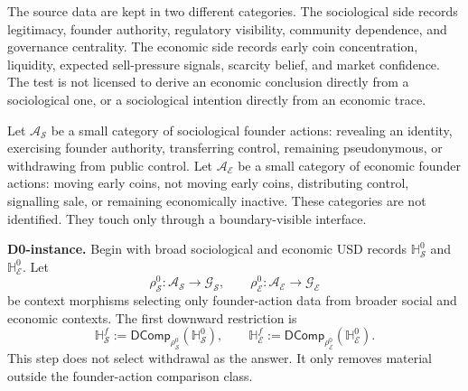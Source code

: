 \documentclass[11pt]{article}
\newcommand{\defeq}{\mathrel{:=}}
\newcommand{\DComp}{\mathsf{DComp}}
\theoremstyle{definition}
\theoremstyle{plain}
\begin{document}
The source data are kept in two different categories.  The sociological
side records legitimacy, founder authority, regulatory visibility,
community dependence, and governance centrality.  The economic side
records early coin concentration, liquidity, expected sell-pressure
signals, scarcity belief, and market confidence.  The test is not
licensed to derive an economic conclusion directly from a sociological
one, or a sociological intention directly from an economic trace.

Let $\mathcal A_{\mathcal S}$ be a small category of sociological founder
actions: revealing an identity, exercising founder authority, transferring
control, remaining pseudonymous, or withdrawing from public control.  Let
$\mathcal A_{\mathcal E}$ be a small category of economic founder actions:
moving early coins, not moving early coins, distributing control,
signalling sale, or remaining economically inactive.  These categories are
not identified.  They touch only through a boundary-visible interface.

\textbf{D0-instance.}  Begin with broad sociological and economic USD records
$\mathbb H_{\mathcal S}^{0}$ and $\mathbb H_{\mathcal E}^{0}$.  Let
\[
  \rho_{\mathcal S}^{0}:
  \mathcal A_{\mathcal S}\to\mathcal G_{\mathcal S},
  \qquad
  \rho_{\mathcal E}^{0}:
  \mathcal A_{\mathcal E}\to\mathcal G_{\mathcal E}
\]
be context morphisms selecting only founder-action data from broader
social and economic contexts.  The first downward restriction is
\[
  \mathbb H_{\mathcal S}^{f}
  \defeq
  \DComp_{\rho_{\mathcal S}^{0}}(\mathbb H_{\mathcal S}^{0}),
  \qquad
  \mathbb H_{\mathcal E}^{f}
  \defeq
  \DComp_{\rho_{\mathcal E}^{0}}(\mathbb H_{\mathcal E}^{0}).
\]
This step does not select withdrawal as the answer.  It only removes
material outside the founder-action comparison class.
\end{document}
